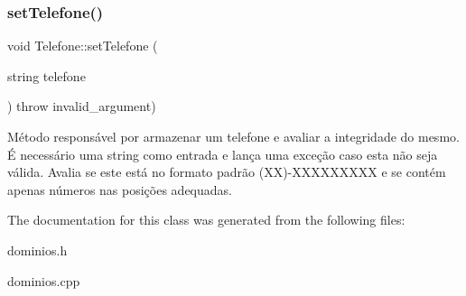 \subsubsection{\texorpdfstring{set\+Telefone()}{setTelefone()}}
{\footnotesize\ttfamily void Telefone\+::set\+Telefone (\begin{DoxyParamCaption}\item[{string}]{telefone }\end{DoxyParamCaption}) throw  invalid\+\_\+argument) }

Método responsável por armazenar um telefone e avaliar a integridade do mesmo. É necessário uma string como entrada e lança uma exceção caso esta não seja válida. Avalia se este está no formato padrão (XX)-\/\+X\+X\+X\+X\+X\+X\+X\+XX e se contém apenas números nas posições adequadas. 

The documentation for this class was generated from the following files\+:\begin{DoxyCompactItemize}
\item 
dominios.\+h\item 
dominios.\+cpp\end{DoxyCompactItemize}
